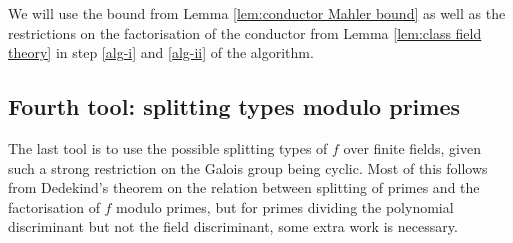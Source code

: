 \documentclass[12pt,reqno]{amsart}
\theoremstyle{definition}
\theoremstyle{plain}
\theoremstyle{definition}
\begin{document}
We will use the bound from Lemma \ref{lem:conductor Mahler bound} as well as the restrictions on the factorisation of the conductor from Lemma \ref{lem:class field theory} in step \eqref{alg-i} and \eqref{alg-ii} of the algorithm. 

\subsection{Fourth tool: splitting types modulo primes} 

The last tool is to use the possible splitting types of $f$ over finite fields, given such a strong restriction on the Galois group being cyclic. Most of this follows from Dedekind's theorem on the relation between splitting of primes and the factorisation of $f$ modulo primes, but for primes dividing the polynomial discriminant but not the field discriminant, some extra work is necessary. 
\end{document}
